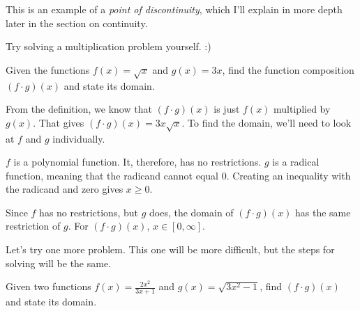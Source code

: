 This is an example of a \textit{point of discontinuity}, which I'll explain in more depth later in the section on continuity.

Try solving a multiplication problem yourself. :)
\begin{problem}
    Given the functions $f(x) = \sqrt{x}$ and $g(x) = 3x$, find the function composition $(f \cdot g)(x)$ and state its domain.
\end{problem}
\clearpage
\begin{solution}
    From the definition, we know that $(f \cdot g)(x)$ is just $f(x)$ multiplied by $g(x)$. That gives $(f \cdot g)(x) = 3x\sqrt{x}$. To find the domain, we'll need to look at $f$ and $g$ individually.

    $f$ is a polynomial function. It, therefore, has no restrictions.
    $g$ is a radical function, meaning that the radicand cannot equal $0$. Creating an inequality with the radicand and zero gives $x \ge 0$.

    Since $f$ has no restrictions, but $g$ does, the domain of $(f \cdot g)(x)$ has the same restriction of $g$. For $(f \cdot g)(x)$, $x \in [0, \infty]$.
\end{solution}
Let's try one more problem. This one will be more difficult, but the steps for solving will be the same.
\begin{problem}
    Given two functions $f(x) = \frac{2x^2}{3x + 1}$ and $g(x) = \sqrt{3x^2 - 1}$, find $(f \cdot g)(x)$ and state its domain.
\end{problem}
